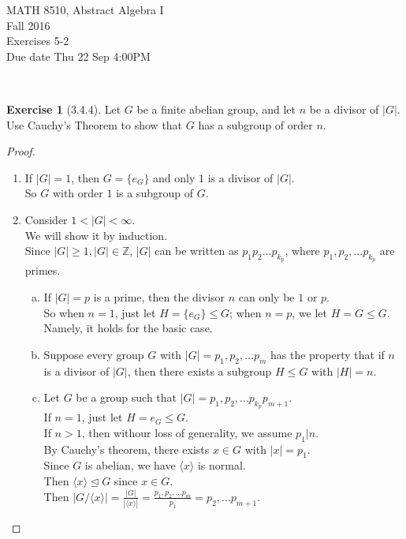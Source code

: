 \documentclass{amsart}
\newcommand{\bbz}{\mathbb{Z}}
\theoremstyle{plain}
\theoremstyle{definition}
\newtheorem{exer}[lem]{Exercise}
\begin{document}
\noindent MATH 8510, Abstract Algebra I \\
Fall 2016\\
Exercises 5-2\\
Due date Thu 22 Sep 4:00PM

\

%
%

\begin{exer}[3.4.4]
Let $G$ be a finite abelian group, and let $n$ be a divisor of $|G|$. 
Use Cauchy's Theorem to show that $G$ has a subgroup of order $n$.
\begin{proof}
	\begin{enumerate}[(1)]
		\item
		  If $|G|=1$, then $G = \{e_G\}$ and only $1$ is a divisor of $|G|$.\\
		  So $G$ with order $1$ is a subgroup of $G$.
		 \item
		 Consider $1 < |G| < \infty$.\\
		 We will show it by induction.\\
		 Since $|G|\geq 1, |G|\in \bbz$, $|G|$ can be written as $p_1p_2...p_{k_p}$, where $p_1,p_2,...p_{k_p}$ are primes.
		 \begin{enumerate}[(a)]
		   \item
             If $|G| = p$ is a prime, then the divisor $n$ can only be $1$ or $p$.\\
             So when $n = 1$, just let $H = \{e_G\} \leq G$; when $n = p$, we let $H = G\leq G$.\\
             Namely, it holds for the basic case.
		 	 \item
		 	  Suppose every group $G$ with $|G|= p_1,p_2,...p_{m}$ has the property that if $n$ is a divisor of $|G|$, then there exists a subgroup $H \leq G$ with $|H|=n$.
		 	  \item
				Let $G$ be a group such that $|G|= p_1,p_2,...p_{k_p}p_{m + 1}$. \\
				If $n=1$, just let $H = {e_G} \leq G$.\\
				If $n > 1$, then withour loss of generality, we assume $p_1|n$.\\
				By Cauchy's theorem, there exists $x \in G$ with $|x| = p_1$. \\
				Since $G$ is abelian, we have $\langle x\rangle$ is normal.\\
				Then $\langle x\rangle \unlhd G$ since $x\in G$.\\
				Then $|G/\langle x\rangle| = \frac{|G|}{|\langle x\rangle|} = \frac{p_1,p_2,...p_{m}}{p_1} = p_2,...p_{m+1}$.\\

\end{enumerate}
\end{enumerate}
\end{proof}
\end{exer}
\end{document}
